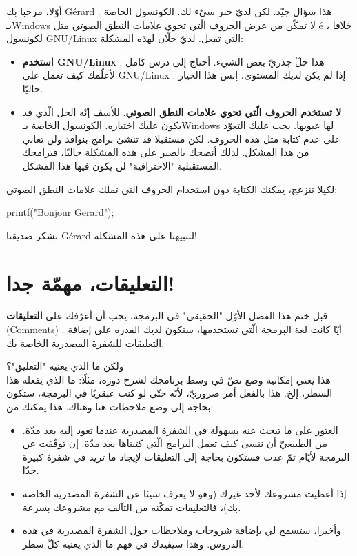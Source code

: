 أوّلا، مرحبا بك
\textenglish{Gérard}
. هذا سؤال جيّد. لكن لديّ خبر سيّء لك. الكونسول الخاصة بـ\textenglish{Windows}
لا تمكّن من عرض الحروف الّتي تحوي علامات النطق الصوتي مثل
\textenglish{é}
، خلافا لكونسول
\textenglish{GNU/Linux}
التي تفعل. لديّ حلّان لهذه المشكلة:

\begin{itemize}
  \item \textbf{استخدم
\textenglish{GNU/Linux}}
. هذا حلّ جذريّ بعض الشيء. أحتاج إلى درس كامل لأعلّمك كيف تعمل على
\textenglish{GNU/Linux}
. إذا لم يكن لديك المستوى، إنس هذا الخيار حاليّا.
  \item \textbf{لا تستخدم الحروف الّتي تحوي علامات النطق الصوتي}.
للأسف إنّه الحل الّذي قد يكون عليك اختياره. الكونسول الخاصة بـ\textenglish{Windows}
لها عيوبها. يجب عليك التعوّد على عدم كتابة مثل هذه الحروف. لكن مستقبلا قد تنشئ برامج بنوافذ ولن تعاني من هذا المشكل. لذلك أنصحك بالصبر على هذه المشكلة حاليّا، فبرامجك المستقبلية "الاحترافية" لن يكون فيها هذا المشكل.
\end{itemize}

لكيلا تنزعج، يمكنك الكتابة دون استخدام الحروف التي تملك علامات النطق الصوتي:

\begin{Csource}
printf("Bonjour Gerard\n");
\end{Csource}

نشكر صديقنا
\textenglish{Gérard}
لتنبيهنا على هذه المشكلة!

\section{التعليقات، مهمّة جدا!}

قبل ختم هذا الفصل الأوّل "الحقيقي" في البرمجة، يجب أن أعرّفك على
\textbf{التعليقات}
(\textenglish{Comments})
. أيّا كانت لغة البرمجة الّتي تستخدمها، ستكون لديك القدرة على إضافة التعليقات للشفرة المصدرية الخاصة بك.

ولكن ما الذي يعنيه "التعليق"؟\\
هذا يعني إمكانية وضع نصّ في وسط برنامجك لشرح دوره، مثلًا: ما الذي يفعله هذا السطر، إلخ. هذا بالفعل أمر ضروريّ، لأنّه حتّى لو كنت عبقريًا في البرمجة، ستكون بحاجة إلى وضع ملاحظات هنا وهناك. هذا يمكنك من:

\begin{itemize}
  \item العثور على ما تبحث عنه بسهولة في الشفرة المصدرية عندما تعود إليه بعد مدّة. من الطبيعيّ أن ننسى كيف تعمل البرامج الّتي كتبناها بعد مدّة. إن توقّفت عن البرمجة لأيّام ثمّ عدت فستكون بحاجة إلى التعليقات لإيجاد ما تريد في شفرة كبيرة جدّا.
  \item إذا أعطيت مشروعك لأحد غيرك (وهو لا يعرف شيئا عن الشفرة المصدرية الخاصة بك)، فالتعليقات تمكّنه من التآلف مع مشروعك بسرعة.
  \item وأخيرا، ستسمح لي بإضافة شروحات وملاحظات حول الشفرة المصدرية في هذه الدروس. وهذا سيفيدك في فهم ما الذي يعنيه كلّ سطر.
\end{itemize}

